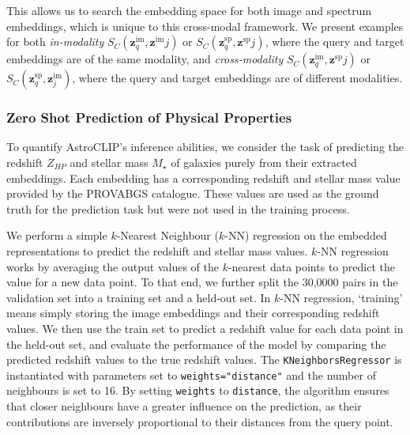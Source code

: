 \documentclass[a4paper,12pt]{article}
\begin{document}
This allows us to search the embedding space for both image and spectrum embeddings, which is unique to this cross-modal framework. We present examples for both \emph{in-modality} $S_{C}(\mathbf{z}^{\text{im}}_q, \mathbf{z}^{\text{im}}j)$ or $S_{C}(\mathbf{z}^{\text{sp}}_q, \mathbf{z}^{\text{sp}}j)$, where the query and target embeddings are of the same modality, and \emph{cross-modality} $S_{C}(\mathbf{z}^{\text{im}}_q, \mathbf{z}^{\text{sp}}j)$ or $S_{C}(\mathbf{z}^{\text{sp}}_q, \mathbf{z}^{\text{im}}_j)$, where the query and target embeddings are of different modalities.





\subsubsection{Zero Shot Prediction of Physical Properties}
To quantify AstroCLIP's inference abilities, we consider the task of predicting the redshift $Z_{HP}$ and stellar mass $M_{\star}$ of galaxies purely from their extracted embeddings. Each embedding has a corresponding redshift and stellar mass value provided by the PROVABGS catalogue. These values are used as the ground truth for the prediction task but were not used in the training process.

We perform a simple $k$-Nearest Neighbour ($k$-NN) regression on the embedded representations to predict the redshift and stellar mass values. $k$-NN regression works by averaging the output values of the $k$-nearest data points to predict the value for a new data point. To that end, we further split the 30,0000 pairs in the validation set into a training set and a held-out set. In $k$-NN regression, `training' means simply storing the image embeddings and their corresponding redshift values. We then use the train set to predict a redshift value for each data point in the held-out set, and evaluate the performance of the model by comparing the predicted redshift values to the true redshift values. The \verb|KNeighborsRegressor| is instantiated with parameters set to \verb|weights="distance"| and the number of neighbours is set to 16. By setting \verb|weights| to \verb|distance|, the algorithm ensures that closer neighbours have a greater influence on the prediction, as their contributions are inversely proportional to their distances from the query point.


\end{document}
